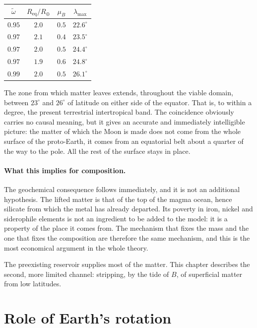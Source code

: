\documentclass[11pt,a4paper,openany]{report}
\newcommand{\Rt}{R_{\oplus}}
\newcommand{\Req}{R_{\mathrm{eq}}}
\begin{document}
\begin{center}
\begin{tabular}{cccc}
\toprule
$\tilde\omega$ & $\Req/\Rt$ & $\mu_B$ & $\lambda_{\max}$ \\
\midrule
$0.95$ & $2.0$ & $0.5$ & $22.6^\circ$ \\
$0.97$ & $2.1$ & $0.4$ & $23.5^\circ$ \\
$0.97$ & $2.0$ & $0.5$ & $24.4^\circ$ \\
$0.97$ & $1.9$ & $0.6$ & $24.8^\circ$ \\
$0.99$ & $2.0$ & $0.5$ & $26.1^\circ$ \\
\bottomrule
\end{tabular}
\end{center}

\begin{ideephys}
The zone from which matter leaves extends, throughout the viable domain, between $23^\circ$ and
$26^\circ$ of latitude on either side of the equator. That is, to within a degree, the present
terrestrial intertropical band. The coincidence obviously carries no causal meaning, but it gives
an accurate and immediately intelligible picture: the matter of which the Moon is made does not
come from the whole surface of the proto-Earth, it comes from an equatorial belt about a quarter of
the way to the pole. All the rest of the surface stays in place.
\end{ideephys}

\paragraph{What this implies for composition.} The geochemical consequence follows immediately, and
it is not an additional hypothesis. The lifted matter is that of the top of the magma ocean, hence
silicate from which the metal has already departed. Its poverty in iron, nickel and siderophile
elements is not an ingredient to be added to the model: it is a property of the place it comes
from. The mechanism that fixes the mass and the one that fixes the composition are therefore the
same mechanism, and this is the most economical argument in the whole theory.


The preexisting reservoir supplies most of the matter. This chapter describes the second, more
limited channel: stripping, by the tide of $B$, of superficial matter from low latitudes.

\section{Role of Earth's rotation}
\end{document}
